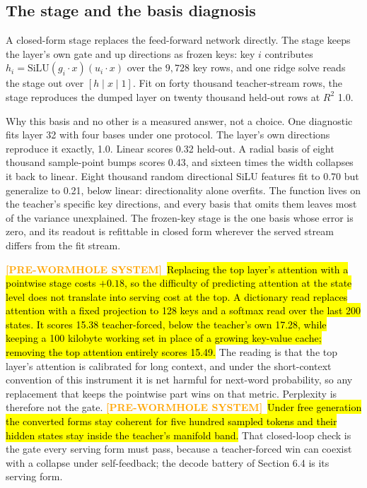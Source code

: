 \documentclass[11pt]{article}
\newcommand{\oldsystem}[1]{%
  {\sethlcolor{orange!25}\textcolor{orange}{\textbf{[PRE-WORMHOLE SYSTEM]}}~\hl{#1}}%
  \sethlcolor{yellow}}
\begin{document}
\subsection{The stage and the basis diagnosis}

A closed-form stage replaces the feed-forward network directly. The
stage keeps the layer's own gate and up directions as frozen keys:
key $i$ contributes $h_i = \mathrm{SiLU}(g_i \cdot x)(u_i \cdot
x)$ over the $9{,}728$ key rows, and one ridge solve reads the
stage out over $[h \mid x \mid 1]$. Fit on forty thousand
teacher-stream rows, the stage reproduces the dumped layer on
twenty thousand held-out rows at $R^2$ 1.0.

Why this basis and no other is a measured answer, not a choice.
One diagnostic fits layer 32 with four bases under one protocol.
The layer's own directions reproduce it exactly, 1.0. Linear
scores 0.32 held-out. A radial basis of eight thousand sample-point
bumps scores 0.43, and sixteen times the width collapses it back
to linear. Eight thousand random directional SiLU features fit to
0.70 but generalize to 0.21, below linear: directionality alone
overfits. The function lives on the teacher's specific key
directions, and every basis that omits them leaves most of the
variance unexplained. The frozen-key stage is the one basis whose
error is zero, and its readout is refittable in closed form
wherever the served stream differs from the fit stream.

\oldsystem{Replacing the top layer's attention with a pointwise stage costs
$+0.18$, so the difficulty of predicting attention at the state
level does not translate into serving cost at the top. A dictionary
read replaces attention with a fixed projection to 128 keys and a
softmax read over the last 200 states. It scores 15.38
teacher-forced, below the teacher's own 17.28, while keeping a 100
kilobyte working set in place of a growing key-value cache;
removing the top attention entirely scores 15.49.} The reading is
that the top layer's attention is calibrated for long context, and
under the short-context convention of this instrument it is net
harmful for next-word probability, so any replacement that keeps
the pointwise part wins on that metric. Perplexity is therefore
not the gate. \oldsystem{Under free generation the converted forms stay
coherent for five hundred sampled tokens and their hidden states
stay inside the teacher's manifold band.} That closed-loop check is
the gate every serving form must pass, because a teacher-forced
win can coexist with a collapse under self-feedback; the decode
battery of Section 6.4 is its serving form.
\end{document}
